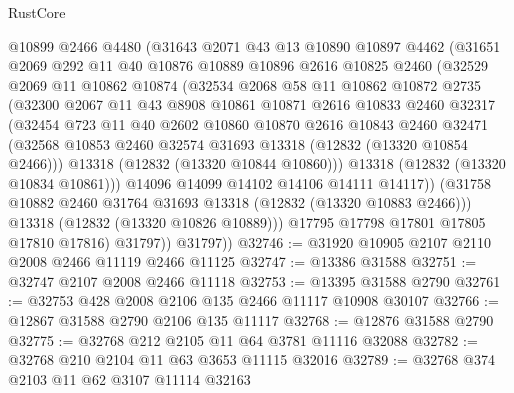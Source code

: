 \begin{lexlean}{RustCore}
\begin{coremodule}
            @10899
            @2466
            @4480
            (@31643
              @2071
              @43
              @13
              @10890
              @10897
              @4462
              (@31651
                @2069
                @292
                @11
                @40
                @10876
                @10889
                @10896
                @2616
                @10825
                @2460
                (@32529
                  @2069
                  @11
                  @10862
                  @10874
                  (@32534
                    @2068
                    @58
                    @11
                    @10862
                    @10872
                    @2735
                    (@32300
                      @2067
                      @11
                      @43
                      @8908
                      @10861
                      @10871
                      @2616
                      @10833
                      @2460
                      @32317
                      (@32454
                        @723
                        @11
                        @40
                        @2602
                        @10860
                        @10870
                        @2616
                        @10843
                        @2460
                        @32471
                        (@32568 @10853 @2460 @32574 @31693 @13318 (@12832 (@13320 @10854 @2466)))
                        @13318
                        (@12832 (@13320 @10844 @10860)))
                      @13318
                      (@12832 (@13320 @10834 @10861)))
                    @14096
                    @14099
                    @14102
                    @14106
                    @14111
                    @14117))
                (@31758 @10882 @2460 @31764 @31693 @13318 (@12832 (@13320 @10883 @2466)))
                @13318
                (@12832 (@13320 @10826 @10889)))
              @17795
              @17798
              @17801
              @17805
              @17810
              @17816)
            @31797))
        @31797))
@32746 := @31920 @10905 @2107 @2110 @2008 @2466 @11119 @2466 @11125
@32747 := @13386 @31588
@32751 := @32747 @2107 @2008 @2466 @11118
@32753 := @13395 @31588 @2790
@32761 := @32753 @428 @2008 @2106 @135 @2466 @11117 @10908 @30107
@32766 := @12867 @31588 @2790 @2106 @135 @11117
@32768 := @12876 @31588 @2790
@32775 := @32768 @212 @2105 @11 @64 @3781 @11116 @32088
@32782 := @32768 @210 @2104 @11 @63 @3653 @11115 @32016
@32789 := @32768 @374 @2103 @11 @62 @3107 @11114 @32163

\end{coremodule}
\end{lexlean}
